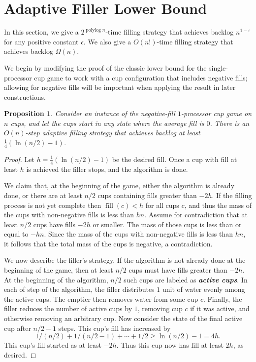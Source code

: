 \documentclass[twocolumn]{article}[10pt]
\newcommand{\defn}[1]{{\textit{\textbf{\boldmath #1}}}\xspace}
\DeclareMathOperator{\polylog}{\text{polylog}}
\DeclareMathOperator{\fil}{\text{fill}}
\newtheorem{proposition}{Proposition}
\begin{document}
\section{Adaptive Filler Lower Bound}\label{sec:adaptive}

In this section, we give a $2^{\polylog n}$-time filling strategy
that achieves backlog $n^{1 - \epsilon}$ for any positive
constant $\epsilon$. 
We also give a $O(n!)$-time filling strategy that achieves
backlog $\Omega(n)$.

We begin by modifying the proof of the classic lower bound for
the single-processor cup game to work with a cup configuration
that includes negative fills; allowing for negative fills will be
important when applying the result in later constructions. 
\begin{proposition}
\label{prop:adaptiveBase}
  Consider an instance of the negative-fill $1$-processor cup
  game on $n$ cups, and let the cups start in any state where the
  average fill is $0$. There is an $O(n)$-step adaptive filling
  strategy that achieves backlog at least
  $\frac{1}{4}(\ln (n/2) - 1)$.
\end{proposition}
\begin{proof}
  Let $h = \frac{1}{4}(\ln (n/2) -1)$ be the desired fill. Once a cup with fill at
  least $h$ is achieved the filler stops, and the algorithm is done.  
  
  We claim that, at the beginning of the game, either the
  algorithm is already done, or there are at least $n / 2$ cups
  containing fills greater than $-2h$. If the filling process is
  not yet complete then $\fil(c) < h$ for all cups $c$, and thus
  the mass of the cups with non-negative fills is less than $hn$.
  Assume for contradiction that at least $n / 2$ cups have fills
  $-2h$ or smaller. The mass of those cups is less than or equal
  to $-hn$. Since the mass of the cups with non-negative fills is
  less than $hn$, it follows that the total mass of the cups is
  negative, a contradiction. 

  We now describe the filler's strategy. If the algorithm is not
  already done at the beginning of the game, then at least $n /
  2$ cups must have fills greater than $-2h$. At the beginning of
  the algorithm, $n / 2$ such cups are labeled as \defn{active
  cups}. In each of step of the algorithm, the filler distributes
  $1$ unit of water evenly among the active cups. The emptier
  then removes water from some cup $c$. Finally, the filler
  reduces the number of active cups by $1$, removing cup $c$ if
  it was active, and otherwise removing an arbitrary cup. Now
  consider the state of the final active cup after $n / 2  - 1$
  steps. This cup's fill has increased by 
  $$1/(n/2) + 1/(n/2 - 1) + \cdots + 1/2 \ge \ln (n/2) -1 = 4h.$$ 
  This cup's fill started as at least $-2h$. Thus this cup now
  has fill at least $2h$, as desired.
\end{proof}
\end{document}
